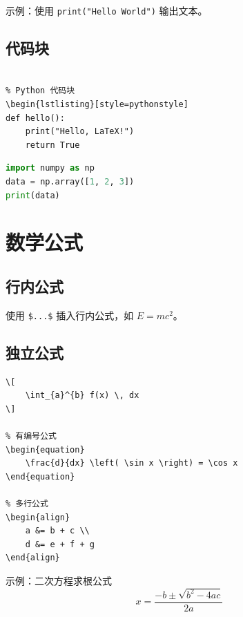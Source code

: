 \documentclass[10pt,openany]{book}
\begin{document}
示例：使用 \texttt{print("Hello World")} 输出文本。

\subsection{代码块}

\begin{lstlisting}[style=pythonstyle]
% 导言区需要设置：\usepackage{listings}

% Python 代码块
\begin{lstlisting}[style=pythonstyle]
def hello():
    print("Hello, LaTeX!")
    return True
\end{lstlisting}

\begin{lstlisting}[language=Python, caption={示例代码}]
import numpy as np
data = np.array([1, 2, 3])
print(data)
\end{lstlisting}

\section{数学公式}

\subsection{行内公式}

使用 \verb|$...$| 插入行内公式，如 $E = mc^2$。

\subsection{独立公式}

\begin{lstlisting}[style=pythonstyle]
% 无编号公式
\[
    \int_{a}^{b} f(x) \, dx
\]

% 有编号公式
\begin{equation}
    \frac{d}{dx} \left( \sin x \right) = \cos x
\end{equation}

% 多行公式
\begin{align}
    a &= b + c \\
    d &= e + f + g
\end{align}
\end{lstlisting}

示例：二次方程求根公式
\begin{equation}
    x = \frac{-b \pm \sqrt{b^2 - 4ac}}{2a}
\label{eq:quadratic}
\end{equation}
\end{document}
